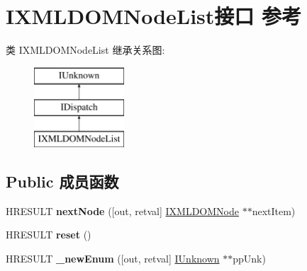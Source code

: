 \hypertarget{interface_i_x_m_l_d_o_m_node_list}{}\section{I\+X\+M\+L\+D\+O\+M\+Node\+List接口 参考}
\label{interface_i_x_m_l_d_o_m_node_list}
类 I\+X\+M\+L\+D\+O\+M\+Node\+List 继承关系图\+:\begin{figure}[H]
\begin{center}
\leavevmode
\includegraphics[height=3.000000cm]{interface_i_x_m_l_d_o_m_node_list}
\end{center}
\end{figure}
\subsection*{Public 成员函数}
\begin{DoxyCompactItemize}
\item 
\mbox{\label{interface_i_x_m_l_d_o_m_node_list_aa0665f5e048b5865a3d60ba2c1f9babc}} 
H\+R\+E\+S\+U\+LT {\bfseries next\+Node} (\mbox{[}out, retval\mbox{]} \hyperlink{interface_i_x_m_l_d_o_m_node}{I\+X\+M\+L\+D\+O\+M\+Node} $\ast$$\ast$next\+Item)
\item 
\mbox{\label{interface_i_x_m_l_d_o_m_node_list_a975ee91a615383cb8da91837035dbf7f}} 
H\+R\+E\+S\+U\+LT {\bfseries reset} ()
\item 
\mbox{\label{interface_i_x_m_l_d_o_m_node_list_a5c5165945b21cb80b7c8cc9a0728a249}} 
H\+R\+E\+S\+U\+LT {\bfseries \+\_\+new\+Enum} (\mbox{[}out, retval\mbox{]} \hyperlink{interface_i_unknown}{I\+Unknown} $\ast$$\ast$pp\+Unk)
\end{DoxyCompactItemize}
